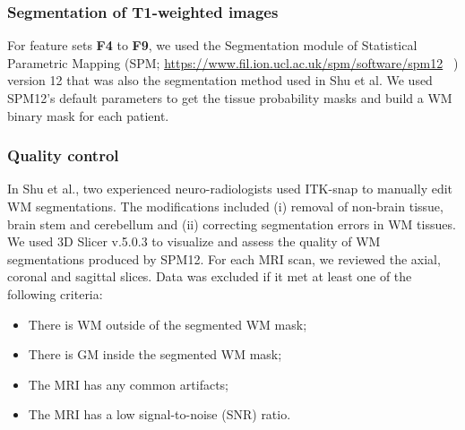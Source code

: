 \subsubsection*{Segmentation of T1-weighted images}
For feature sets \textbf{F4} to \textbf{F9}, we used the Segmentation module of Statistical Parametric Mapping (SPM; \url{https://www.fil.ion.ucl.ac.uk/spm/software/spm12} ~\cite{ashburner2012spm}) version 12 that was also the segmentation method used in Shu et al. We used SPM12's default parameters to get the tissue probability masks and build a WM binary mask for each patient. 


\subsubsection*{Quality control}

In Shu et al., two experienced neuro-radiologists used ITK-snap to manually edit WM segmentations. The modifications included (i) removal of non-brain tissue, brain stem and cerebellum and (ii) correcting segmentation errors in WM tissues. We used 3D Slicer v.5.0.3 to visualize and assess the quality of WM segmentations produced by SPM12. For each MRI scan, we reviewed the axial, coronal and sagittal slices. Data was excluded if it met at least one of the following criteria:

\begin{itemize}
    \item There is WM outside of the segmented WM mask;
    \item There is GM inside the segmented WM mask;
    \item The MRI has any common artifacts;
    \item The MRI has a low signal-to-noise (SNR) ratio.
\end{itemize}